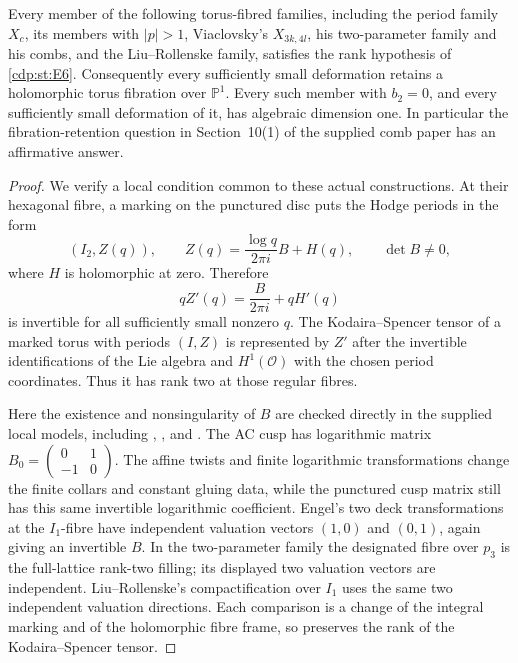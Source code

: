 
\begin{proposition}\label{cdp:st:E7}
Every member of the following torus-fibred families,
including the period family $X_c$, its members with $|p|>1$,
Viaclovsky's $X_{3k,4l}$, his two-parameter family and his combs,
and the Liu--Rollenske family, satisfies the rank hypothesis of \ref{cdp:st:E6}.
Consequently every sufficiently small deformation retains a
holomorphic torus fibration over $\mathbb P^1$. Every such member
with $b_2=0$, and every sufficiently small deformation of it, has
algebraic dimension one. In particular the fibration-retention
question in Section~10(1) of the supplied comb paper has an
affirmative answer.
\end{proposition}
\begin{proof}
We verify a local condition common to these actual constructions.
At their hexagonal fibre, a marking on the punctured disc puts
the Hodge periods in the form
\begin{equation}\label{cdp:eq:E-log-period}
  (I_2,Z(q)),\qquad
 Z(q)=\frac{\log q}{2\pi i}B+H(q),
 \qquad \det B\ne0,
\end{equation}
where $H$ is holomorphic at zero. Therefore
\[
 qZ'(q)=\frac{B}{2\pi i}+qH'(q)
\]
is invertible for all sufficiently small nonzero $q$. The
Kodaira--Spencer tensor of a marked torus with periods $(I,Z)$
is represented by $Z'$ after the invertible identifications of
the Lie algebra and $H^1(\mathcal O)$ with the chosen period
coordinates. Thus it has rank two at those regular fibres.

Here the existence and nonsingularity of $B$ are checked directly
in the supplied local models, including
\cite[Proposition labelled \texttt{hexfill}]{Viaclovsky2026Combs},
\cite[Proposition labelled \texttt{mum}]{Viaclovsky2026Two}, and
\cite[Proposition labelled \texttt{prop: compactification X}]{LiuRollenske2026}.
The AC cusp has logarithmic matrix
$B_0=\left(\begin{smallmatrix}0&1\\-1&0\end{smallmatrix}\right)$.
The affine twists and finite logarithmic transformations change
the finite collars and constant gluing data, while the punctured
cusp matrix still has this same invertible logarithmic coefficient.
Engel's two deck transformations at the $I_1$-fibre have independent
valuation vectors $(1,0)$ and $(0,1)$, again giving an invertible
$B$. In the two-parameter family the designated fibre over $p_3$
is the full-lattice rank-two filling; its displayed two valuation
vectors are independent. Liu--Rollenske's compactification over
$I_1$ uses the same two independent valuation directions. Each
comparison is a change of the integral marking and of the
holomorphic fibre frame, so preserves the rank of the
Kodaira--Spencer tensor.


\end{proof}
